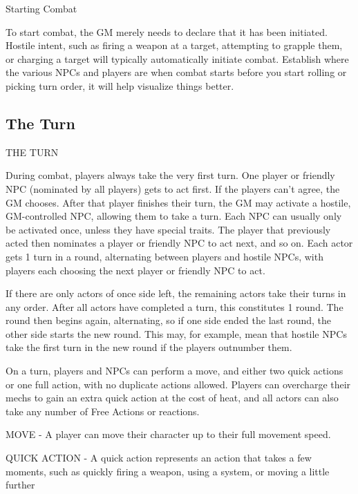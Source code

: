                                               Starting Combat  

To start combat, the GM merely needs to declare that it has been initiated. Hostile intent, such  
as firing a weapon at a target, attempting to grapple them, or charging a target will typically  
automatically initiate combat. Establish where the various NPCs and players are when combat  
starts before you start rolling or picking turn order, it will help visualize things better.  

\subsection{The Turn}
                                                THE TURN  

                                                                                                              


During combat, players always take the very first turn. One player or friendly NPC (nominated  
by all players) gets to act first. If the players can’t agree, the GM chooses. After that player  
finishes their turn, the GM may activate a hostile, GM-controlled NPC, allowing them to take a  
turn. Each NPC can usually only be activated once, unless they have special traits. The player  
that previously acted then nominates a player or friendly NPC to act next, and so on. Each  
actor gets 1 turn in a round, alternating between players and hostile NPCs, with players each  
choosing the next player or friendly NPC to act.
 

If there are only actors of once side left, the remaining actors take their turns in any order. After  
all actors have completed a turn, this constitutes 1 round. The round then begins again,  
alternating, so if one side ended the last round, the other side starts the new round. This may, for  
example, mean that hostile NPCs take the first turn in the new round if the players outnumber  
them.  

On a turn, players and NPCs can perform a move, and either two quick actions or one full  
action, with no duplicate actions allowed. Players can overcharge their mechs to gain an extra  
quick action at the cost of heat, and all actors can also take any number of Free Actions or  
reactions.
 

MOVE - A player can move their character up to their full movement speed.
 
QUICK ACTION - A quick action represents an action that takes a few moments, such as  
quickly firing a weapon, using a system, or moving a little further
 

